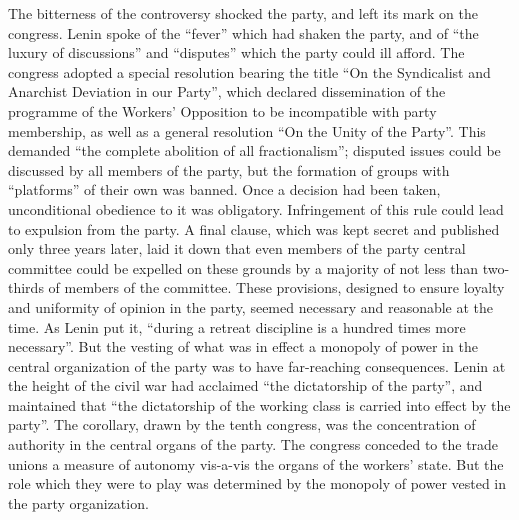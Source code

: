 The bitterness of the controversy shocked the party, and left its mark on the congress. Lenin spoke of the ``fever'' which had shaken the party, and of ``the luxury of discussions'' and ``disputes'' which the party could ill afford. The congress adopted a special resolution bearing the title ``On the Syndicalist and Anarchist Deviation in our Party'', which declared dissemination of the programme of the Workers' Opposition to be incompatible with party membership, as well as a general resolution ``On the Unity of the Party''. This demanded ``the complete abolition of all fractionalism''; disputed issues could be discussed by all members of the party, but the formation of groups with ``platforms'' of their own was banned. Once a decision had been taken, unconditional obedience to it was obligatory. Infringement of this rule could lead to expulsion from the party. A final clause, which was kept secret and published only three years later, laid it down that even members of the party central committee could be expelled on these grounds by a majority of not less than two-thirds of members of the committee. These provisions, designed to ensure loyalty and uniformity of opinion in the party, seemed necessary and reasonable at the time. As Lenin put it, ``during a retreat discipline is a hundred times more necessary''. But the vesting of what was in effect a monopoly of power in the central organization of the party was to have far-reaching consequences. Lenin at the height of the civil war had acclaimed ``the dictatorship of the party'', and maintained that ``the dictatorship of the working class is carried into effect by the party''. The corollary, drawn by the tenth congress, was the concentration of authority in the central organs of the party. The congress conceded to the trade unions a measure of autonomy vis-a-vis the organs of the workers' state. But the role which they were to play was determined by the monopoly of power vested in the party organization. 

